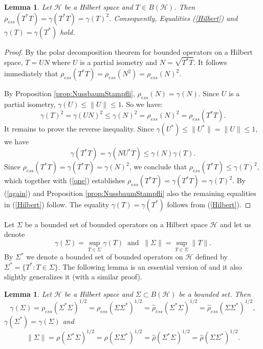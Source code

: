 \documentclass[12pt, reqno]{amsart}
\newtheorem{lemma}[theorem]{Lemma}
\theoremstyle{definition}
\theoremstyle{remark}
\numberwithin{equation}{section}
\newcommand{\be}{\begin{equation}}
\newcommand{\ee}{\end{equation}}
\begin{document}
\begin{lemma}
\label{Hilb1}
Let $\mathcal{H}$ be a Hilbert space and $T \in B(\mathcal{H})$. %
Then $\rho_{ess}(T^*T) =\gamma(T^*T)= \gamma(T)^2$.  Consequently, Equalities (\ref{Hilbert}) and $\gamma (T)=\gamma (T^*)$ hold.
\end{lemma}

\begin{proof}
By the polar decomposition theorem for bounded operators on a Hilbert space, $T = UN$ where $U$ is a partial isometry and $N = \sqrt{T^*T}$. It follows immediately that $\rho_{ess}(T^*T) = \rho_{ess}(N^2) = \rho_{ess}(N)^2$.   

By Proposition \ref{prop:NussbaumStampfli}, $\rho_{ess} (N) = \gamma(N)$. Since $U$ is a partial isometry, $\gamma(U) \le \|U\| \le 1$.  So we have:
\be
\gamma(T)^2 = \gamma(UN)^2 \le \gamma(N)^2 = \rho_{ess}(N)^2 = \rho_{ess}(T^*T).
\label{one}
\ee
It remains to prove the reverse inequality.  Since $\gamma(U^*) \le \|U^*\| =\|U\| \le 1$, we have
$$\gamma(T^*T) = \gamma(N U^* T) \le \gamma(N) \gamma(T).$$
Since $\rho_{ess}(T^*T) = \gamma(T^*T) = \gamma(N)^2$,
we conclude that $\rho_{ess}(T^*T) \le \gamma(T)^2$, which together with (\ref{one}) establishes
$\rho_{ess}(T^*T) =\gamma(T^*T)= \gamma(T)^2$. By (\ref{again}) and Proposition \ref{prop:NussbaumStampfli} also the remaining equalities in (\ref{Hilbert}) follow. The equality $\gamma (T)=\gamma (T^*)$ follows from (\ref{Hilbert}).
\end{proof}

Let $\Sigma$ be a bounded set of bounded operators on a Hilbert space $\mathcal{H}$ and let us denote
$$\gamma (\Sigma) = \sup _{T \in \Sigma } \gamma (T) \;\; \mathrm{and}\;\; \|\Sigma\| = \sup _{T \in \Sigma } \|T\|. $$
By $\Sigma^*$  we denote a bounded set of bounded operators on $\mathcal{H}$ defined by $\Sigma ^*=\{T^*: T \in\Sigma \}.$ The following lemma is an essential version of \cite[Lemma 3.1.]{B23+} and it also slightly generalizes it (with a similar proof).

\begin{lemma} Let $\mathcal{H}$ be a Hilbert space and $\Sigma \subset B(\mathcal{H})$ be a bounded set. Then 
\be
\gamma (\Sigma )=\rho _{ess}(\Sigma^*\Sigma)^{1/2}=\rho _{ess}(\Sigma\Sigma^*)^{1/2}=\hat{\rho} _{ess}(\Sigma^*\Sigma)^{1/2}=\hat{\rho} _{ess} (\Sigma \Sigma^*)^{1/2},
\label{tool_ess}
\ee
$\gamma (\Sigma^*)= \gamma (\Sigma)$ 
and
\be
\|\Sigma\|=\rho(\Sigma^*\Sigma)^{1/2}=\rho(\Sigma\Sigma^*)^{1/2}=\hat{\rho}(\Sigma^*\Sigma)^{1/2}=\hat{\rho}(\Sigma \Sigma^*)^{1/2}.
\label{tool}
\ee
\end{lemma}
\end{document}
